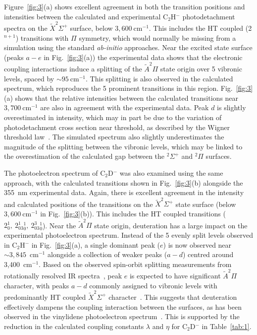 \documentclass[aip,graphicx]{revtex4-1}
\begin{document}
Figure~\ref{fig:3}(a) shows excellent agreement in both the transition positions and intensities between the calculated and experimental C$_2$H$^-$ photodetachment spectra on the $\tilde{X} ^2\Sigma^+$ surface, below $3,600~$cm$^{-1}$. This includes the HT coupled (2$^{n+1}$) transitions with $\Pi$ symmetry, which would normally be missing from a simulation using the standard \emph{ab-initio} approaches. Near the excited state surface (peaks $a-e$ in Fig.~\ref{fig:3}(a)) the experimental data shows that the electronic coupling interactions induce a splitting of the $\tilde{A} ^2\Pi$ state origin over 5 vibronic levels, spaced by $\sim 95~$cm$^{-1}$. This splitting is also observed in the calculated spectrum, which reproduces the 5 prominent transitions in this region. Fig.~\ref{fig:3}(a) shows that the relative intensities between the calculated transitions near $3,700~$cm$^{-1}$ are also in agreement with the experimental data. Peak $d$ is slightly overestimated in intensity, which may in part be due to the variation of photodetachment cross section near threshold, as described by the Wigner threshold law~\cite{wig48}. The simulated spectrum also slightly underestimates the magnitude of the splitting between the vibronic levels, which may be linked to the overestimation of the calculated gap between the $^2\Sigma^+$ and $^2\Pi$ surfaces.

The photoelectron spectrum of C$_2$D$^-$ was also examined using the same approach, with the calculated transitions shown in Fig.~\ref{fig:3}(b) alongside the 355~nm experimental data. Again, there is excellent agreement in the intensity and calculated positions of the transitions on the $\tilde{X} ^2\Sigma^+$ state surface (below $3,600~$cm$^{-1}$ in Fig.~\ref{fig:3}(b)). This includes the HT coupled transitions ($2^1_0,~2^1_03^1_0,~2^3_03^1_0$). Near the $\tilde{A} ^2\Pi$ state origin, deuteration has a large impact on the experimental photoelectron spectrum. Instead of the 5 evenly split levels observed in C$_2$H$^-$ in Fig.~\ref{fig:3}(a), a single dominant peak ($e$) is now observed near $\sim3,845$~cm$^{-1}$ alongside a collection of weaker peaks ($a-d$) centred around 3,400~cm$^{-1}$. Based on the observed spin-orbit splitting measurements from rotationally resolved IR spectra~\cite{yan87,sch98,ste88}, peak $e$ is expected to have significant $\tilde{A} ^2\Pi$ character, with peaks $a-d$ commonly assigned to vibronic levels with predominantly HT coupled $\tilde{X} ^2\Sigma^+$ character~\cite{yan87,hsu95,chi99,wil11}. This suggests that deuteration effectively dampens the coupling interaction between the surfaces, as has been observed in the vinylidene photoelectron spectrum~\cite{dev17}. This is supported by the reduction in the calculated coupling constants $\lambda$ and $\eta$ for C$_2$D$^-$ in Table~\ref{tab:1}.
\end{document}
